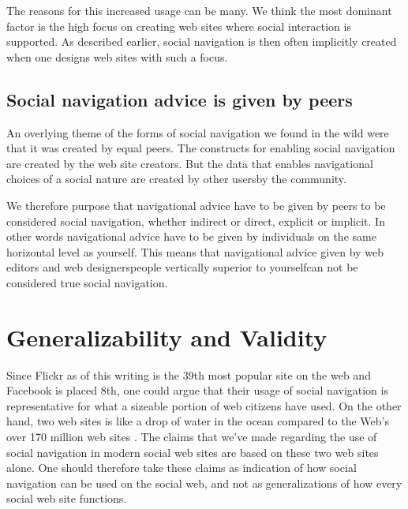 The reasons for this increased usage can be many. We think the most dominant
factor is the high focus on creating web sites where social interaction is
supported. As described earlier, social navigation is then often
implicitly created when one designs web sites with such a focus.

\subsection{Social navigation advice is given by peers}

An overlying theme of the forms of social navigation we found in the wild were
that it was created by equal peers. The constructs for enabling social
navigation are created by the web site creators. But the data that
enables navigational choices of a social nature are created by other
users\dash{}by the community.

We therefore purpose that navigational advice have to
be given by peers to be considered social navigation,
whether indirect or direct, explicit or implicit.
In other words
navigational advice have to be given by individuals on the same horizontal
level as yourself. This means that navigational advice given by web editors
and web designers\dash{}people vertically superior to yourself\dash{}can not
be considered true social navigation.

\section{Generalizability and Validity}

Since Flickr as of this writing is the 39th most popular site on the web
and Facebook is placed 8th,%
one could argue that their usage of social navigation is representative
for what a sizeable portion of web citizens have used. On the other hand, two
web sites is like a drop of water in the ocean compared to the Web's over
170 million web sites \citep{netcraft08}. The claims that we've made
regarding the use of social navigation in modern social web sites are based
on these two web sites alone. One should therefore take these claims
as indication of how social navigation can be used on the social web, and not
as generalizations of how every social web site functions.

